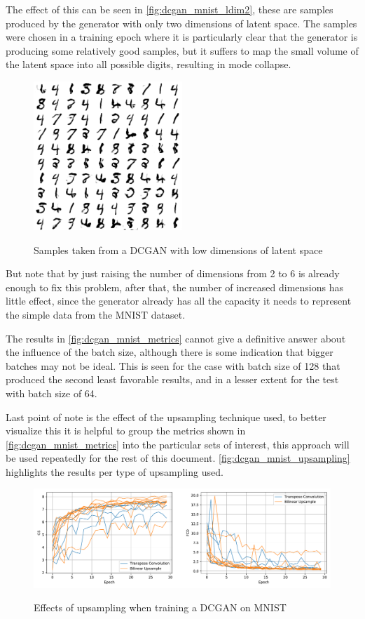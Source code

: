 The effect of this can be seen in \autoref{fig:dcgan_mnist_ldim2}, these are samples produced by the generator with only two dimensions of latent space. The samples were chosen in a training epoch where it is particularly clear that the generator is producing some relatively good samples, but it suffers to map the small volume of the latent space into all possible digits, resulting in mode collapse.
\begin{figure}[hbt]
    \centering
    \caption{Samples taken from a DCGAN with low dimensions of latent space}
    \includegraphics[width=0.5\textwidth]{chapters/Experiments/DCGAN/mnist_ldim2.png}
    \label{fig:dcgan_mnist_ldim2}
\end{figure}

But note that by just raising the number of dimensions from 2 to 6 is already enough to fix this problem, after that, the number of increased dimensions has little effect, since the generator already has all the capacity it needs to represent the simple data from the \gls{MNIST} dataset.

The results in \autoref{fig:dcgan_mnist_metrics} cannot give a definitive answer about the influence of the batch size, although there is some indication that bigger batches may not be ideal. This is seen for the case with batch size of 128 that produced the second least favorable results, and in a lesser extent for the test with batch size of 64.

Last point of note is the effect of the upsampling technique used, to better visualize this it is helpful to group the metrics shown in \autoref{fig:dcgan_mnist_metrics} into the particular sets of interest, this approach will be used repeatedly for the rest of this document. \autoref{fig:dcgan_mnist_upsampling} highlights the results per type of upsampling used.
\begin{figure}[hbt]
    \centering
    \caption{Effects of upsampling when training a DCGAN on MNIST}
    \includegraphics[width=\textwidth]{chapters/Experiments/DCGAN/mnist_upsampling.pdf}
    \label{fig:dcgan_mnist_upsampling}
\end{figure}

